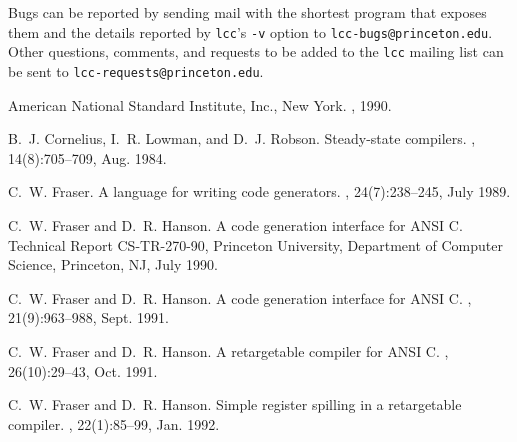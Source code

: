 Bugs can be reported by sending mail with the shortest program
that exposes them and the details reported by \verb|lcc|'s \verb|-v|
option to \verb|lcc-bugs@princeton.edu|.
Other questions, comments, and requests to be added
to the \verb|lcc| mailing list can be sent to \verb|lcc-requests@princeton.edu|.

%
\begin{thebibliography}{1}

American National Standard Institute, Inc., New York.
, 1990.

B.~J. Cornelius, I.~R. Lowman, and D.~J. Robson.
\newblock Steady-state compilers.
, 14(8):705--709, Aug. 1984.

C.~W. Fraser.
\newblock A language for writing code generators.
, 24(7):238--245, July 1989.

C.~W. Fraser and D.~R. Hanson.
\newblock A code generation interface for {ANSI C}.
\newblock Technical Report CS-TR-270-90, Princeton University, Department of
  Computer Science, Princeton, NJ, July 1990.

C.~W. Fraser and D.~R. Hanson.
\newblock A code generation interface for {ANSI C}.
, 21(9):963--988, Sept. 1991.

C.~W. Fraser and D.~R. Hanson.
\newblock A retargetable compiler for {ANSI C}.
, 26(10):29--43, Oct. 1991.

C.~W. Fraser and D.~R. Hanson.
\newblock Simple register spilling in a retargetable compiler.
, 22(1):85--99, Jan. 1992.

\end{thebibliography}


